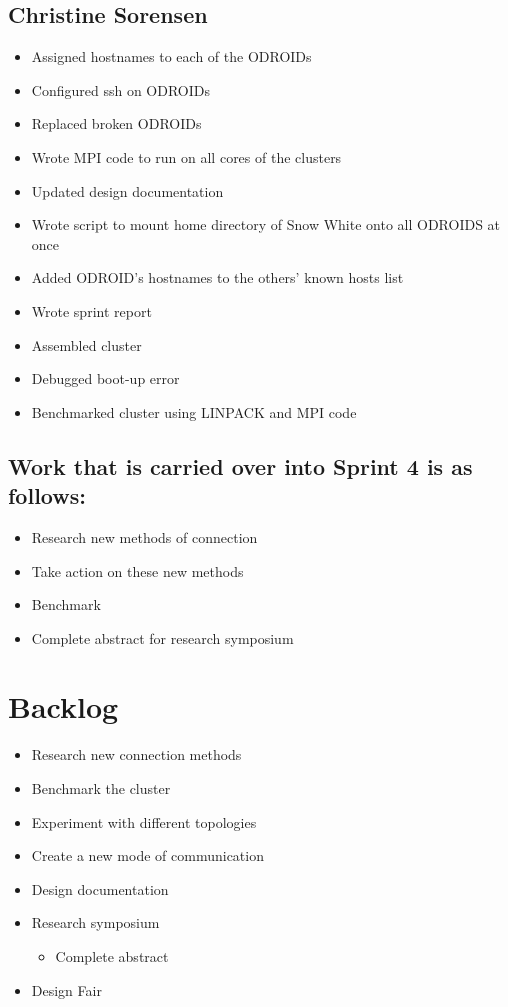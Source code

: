 \documentclass{article}
\begin{document}
\subsection*{Christine Sorensen}
\begin{itemize}
	\item Assigned hostnames to each of the ODROIDs
	\item Configured ssh on ODROIDs
	\item Replaced broken ODROIDs
	\item Wrote MPI code to run on all cores of the clusters
	\item Updated design documentation
	\item Wrote script to mount home directory of Snow White onto all ODROIDS at once
	\item Added ODROID's hostnames to the others' known hosts list
	\item Wrote sprint report 
	\item Assembled cluster
	\item Debugged boot-up error
	\item Benchmarked cluster using LINPACK and MPI code
\end{itemize}

\subsection*{Work that is carried over into Sprint 4 is as follows:}
\begin{itemize}
	\item Research new methods of connection
	\item Take action on these new methods
	\item Benchmark
	\item Complete abstract for research symposium
\end{itemize}

\section*{Backlog}
\begin{itemize}
	\item Research new connection methods
	\item Benchmark the cluster
	\item Experiment with different topologies
	\item Create a new mode of communication
	\item Design documentation
	\item Research symposium
	\begin{itemize}
		\item Complete abstract
	\end{itemize}
	\item Design Fair
\end{itemize}
\end{document}
